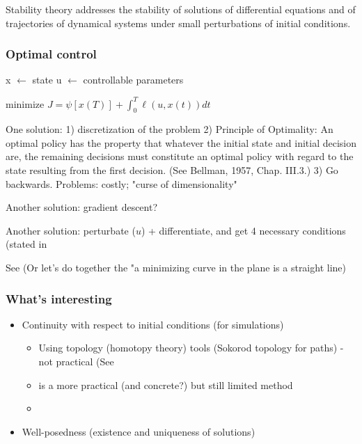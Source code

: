 \begin{frame}
	Stability theory addresses the stability of solutions of differential equations and of trajectories of dynamical systems under small perturbations of initial conditions.
\end{frame}

\begin{frame}
	\frametitle{Optimal control}
	x $\leftarrow$ state
	u $\leftarrow$ controllable parameters
		
	
	minimize 	$J = \psi[x(T)] + \int_{0}^{T} \ell(u,x(t)) dt$
\end{frame}

\begin{frame}
	One solution:
	1) discretization of the problem
	2) Principle of Optimality: An optimal policy has the property that whatever the initial state and initial decision are, the remaining decisions must constitute an optimal policy with regard to the state resulting from the first decision. (See Bellman, 1957, Chap. III.3.)
	3) Go backwards.
	Problems: costly; "curse of dimensionality"
\end{frame}

\begin{frame}
	Another solution: gradient descent?
\end{frame}

\begin{frame}
	Another solution: perturbate ($u$) + differentiate, and get 4 necessary conditions (stated in
	
	See %
	(Or let's do together the "a minimizing curve in the plane is a straight line) %
\end{frame}




\begin{frame}
\frametitle{What's interesting}
\begin{itemize}
	\item Continuity with respect to initial conditions (for simulations)
	\begin{itemize}
		\item Using topology (homotopy theory) tools (Sokorod topology for paths) - not practical (See %
		\item %
		is a more practical (and concrete?) but still limited method
	\item 
	\end{itemize}
	\item Well-posedness (existence and uniqueness of solutions)
\end{itemize}


\end{frame}

